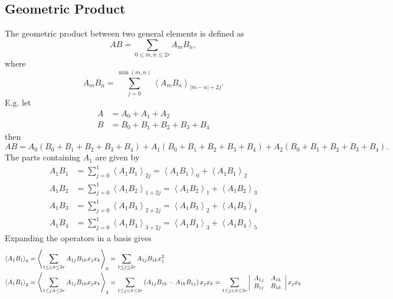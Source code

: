 \documentclass[aps,preprint]{revtex4}%
\begin{document}
\subsection{Geometric Product}

The geometric product between two general elements is defined as
\begin{equation}
AB=\sum_{0\leq m,n\leq2r}A_{m}B_{n},
\end{equation}
where
\begin{equation}
A_{m}B_{n}=\sum_{j=0}^{\min\left(  m,n\right)  }\left\langle A_{m}%
B_{n}\right\rangle _{\left\vert m-n\right\vert +2j}.
\end{equation}
E.g. let
\begin{align}
A  &  =A_{0}+A_{1}+A_{2}\\
B  &  =B_{0}+B_{1}+B_{2}+B_{3}+B_{4}%
\end{align}
then
\begin{equation}
AB=A_{0}\left(  B_{0}+B_{1}+B_{2}+B_{3}+B_{4}\right)  +A_{1}\left(
B_{0}+B_{1}+B_{2}+B_{3}+B_{4}\right)  +A_{2}\left(  B_{0}+B_{1}+B_{2}%
+B_{3}+B_{4}\right)  .
\end{equation}
The parts containing $A_{1}$ are given by
\begin{align}
A_{1}B_{1}  &  =\sum_{j=0}^{1}\left\langle A_{1}B_{1}\right\rangle
_{2j}=\left\langle A_{1}B_{1}\right\rangle _{0}+\left\langle A_{1}%
B_{1}\right\rangle _{2}\\
A_{1}B_{2}  &  =\sum_{j=0}^{1}\left\langle A_{1}B_{2}\right\rangle
_{1+2j}=\left\langle A_{1}B_{2}\right\rangle _{1}+\left\langle A_{1}%
B_{2}\right\rangle _{3}\\
A_{1}B_{3}  &  =\sum_{j=0}^{1}\left\langle A_{1}B_{3}\right\rangle
_{2+2j}=\left\langle A_{1}B_{3}\right\rangle _{2}+\left\langle A_{1}%
B_{3}\right\rangle _{4}\\
A_{1}B_{4}  &  =\sum_{j=0}^{1}\left\langle A_{1}B_{4}\right\rangle
_{3+2j}=\left\langle A_{1}B_{4}\right\rangle _{3}+\left\langle A_{1}%
B_{4}\right\rangle _{5}%
\end{align}
Expanding the operators in a basis gives
\begin{align}
\left\langle A_{1}B_{1}\right\rangle _{0}  &  =\left\langle \sum_{1\leq
j,k\leq2r}A_{1j}B_{1k}x_{j}x_{k}\right\rangle _{0}=\sum_{1\leq j\leq2r}%
A_{1j}B_{1k}x_{j}^{2}\\
\left\langle A_{1}B_{1}\right\rangle _{2}  &  =\left\langle \sum_{1\leq
j,k\leq2r}A_{1j}B_{1k}x_{j}x_{k}\right\rangle _{2}=\sum_{1\leq j<k\leq
2r}\left(  A_{1j}B_{1k}-A_{1k}B_{1j}\right)  x_{j}x_{k}=\sum_{1\leq j<k\leq
2r}\left\vert
\begin{array}
[c]{cc}%
A_{1j} & A_{1k}\\
B_{1j} & B_{1k}%
\end{array}
\right\vert x_{j}x_{k}%
\end{align}%
\end{document}
